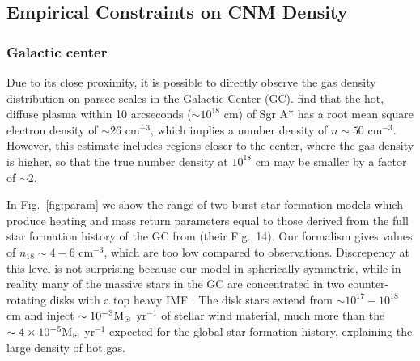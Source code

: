 \documentclass[usenatbib,fleqn]{mnras}
\newcommand{\Msun}{{\rm M_\odot}}
\begin{document}

\subsection{Empirical Constraints on CNM Density}
\label{sec:empirical}

\subsubsection{Galactic center} 
Due to its close proximity, it is possible to directly observe the gas
density distribution on parsec scales in the Galactic Center
(GC). \citet{Baganoff+2003} find that the hot, diffuse plasma within
10 arcseconds ($\sim 10^{18}$ cm) of Sgr A* has a root mean square
electron density of $\sim 26$ cm$^{-3}$, which implies a number
density of $n\sim 50$ cm$^{-3}$. However, this estimate includes
regions closer to the center, where the gas density is higher, so that
the true number density at $10^{18}$ cm may be smaller by a factor of
$\sim 2$.

In Fig.~\ref{fig:param} we show the range of two-burst star formation
models which produce heating and mass return parameters equal to those
derived from the full star formation history of the GC from
\citet{Pfuhl+2011} (their Fig.~14).  Our formalism gives values of
$n_{18}\sim 4-6$ cm$^{-3}$, which are too low compared to
observations.  Discrepency at this level is not surprising because our
model in spherically symmetric, while in reality many of the massive
stars in the GC are concentrated in two counter-rotating disks
\citep{Genzel+2003} with a top heavy IMF \citep{Bartko+2010}.  The
disk stars extend from $\sim 10^{17}-10^{18}$ cm and inject $\sim
10^{-3} \Msun$ yr$^{-1}$ of stellar wind material, much more than the
$\sim 4 \times 10^{-5} \Msun$ yr$^{-1}$ expected for the global star
formation history, explaining the large density of hot gas.
\end{document}
